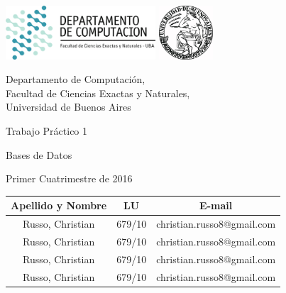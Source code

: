 \documentclass[a4paper, 10pt, twoside]{article}
\newcommand{\titulo}{Trabajo Práctico 1}
\newcommand{\materia}{Bases de Datos}
\newcommand{\cuatrimestre}{Primer Cuatrimestre de 2016}
\begin{document}


\thispagestyle{caratula}

\begin{center}

\includegraphics[height=2cm]{DC.png} 
\hfill
\includegraphics[height=2cm]{UBA.jpg} 

\vspace{2cm}

Departamento de Computación,\\
Facultad de Ciencias Exactas y Naturales,\\
Universidad de Buenos Aires

\vspace{4cm}

\begin{Huge}
\titulo
\end{Huge}

\vspace{0.5cm}

\begin{Large}
\materia
\end{Large}

\vspace{1cm}

\cuatrimestre

\vspace{4cm}

\begin{tabular}{|c|c|c|}
\hline
Apellido y Nombre & LU & E-mail\\
\hline
Russo, Christian  & 679/10 & christian.russo8@gmail.com\\
Russo, Christian  & 679/10 & christian.russo8@gmail.com\\
Russo, Christian  & 679/10 & christian.russo8@gmail.com\\
Russo, Christian  & 679/10 & christian.russo8@gmail.com\\
\hline
\end{tabular}

\end{center}
\end{document}
